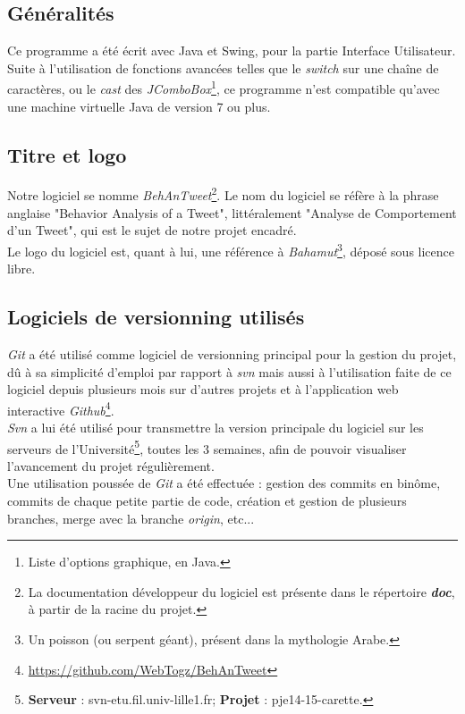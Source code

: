 \documentclass[pdftex,12pt,a4paper]{report}
\begin{document}
\begin{spacing}{1.2}
\section{Généralités}

Ce programme a été écrit avec Java et Swing, pour la partie Interface Utilisateur.
\\
Suite à l'utilisation de fonctions avancées telles que le \textit{switch} sur une chaîne de caractères, ou le \textit{cast} des \textit{JComboBox}\footnote{Liste d'options graphique, en Java.}, ce programme n'est compatible qu'avec une machine virtuelle Java de version 7 ou plus.

\subsection{Titre et logo}

Notre logiciel se nomme \textit{BehAnTweet}\footnote{La documentation développeur du logiciel est présente dans le répertoire \textit{\textbf{doc}}, à partir de la racine du projet.}. Le nom du logiciel se réfère à la phrase anglaise "Behavior Analysis of a Tweet", littéralement "Analyse de Comportement d'un Tweet", qui est le sujet de notre projet encadré.
\\
Le logo du logiciel est, quant à lui, une référence à \textit{Bahamut}\footnote{Un poisson (ou serpent géant), présent dans la mythologie Arabe.}, déposé sous licence libre.

\subsection{Logiciels de versionning utilisés}

\textit{Git} a été utilisé comme logiciel de versionning principal pour la gestion du projet, dû à sa simplicité d'emploi par rapport à \textit{svn} mais aussi à l'utilisation faite de ce logiciel depuis plusieurs mois sur d'autres projets et à l'application web interactive \textit{Github}\footnote{\url{https://github.com/WebTogz/BehAnTweet}}.\\
\textit{Svn} a lui été utilisé pour transmettre la version principale du logiciel sur les serveurs de l'Université\footnote{\textbf{Serveur} : svn-etu.fil.univ-lille1.fr; \textbf{Projet} : pje14-15-carette.}, toutes les 3 semaines, afin de pouvoir visualiser l'avancement du projet régulièrement.
\\
Une utilisation poussée de \textit{Git} a été effectuée : gestion des commits en binôme, commits de chaque petite partie de code, création et gestion de plusieurs branches, merge avec la branche \textit{origin}, etc...


\end{spacing}
\end{document}
